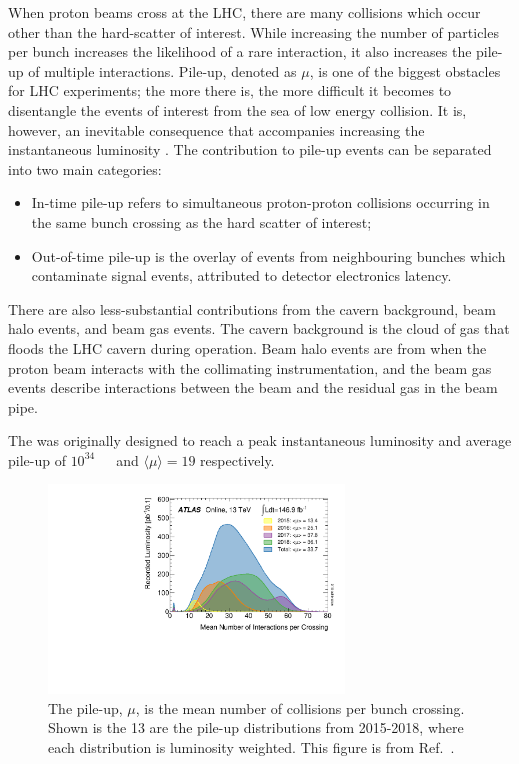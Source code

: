 When proton beams cross at the LHC, there are many collisions which occur other than the hard-scatter of interest. While increasing the number of particles per bunch increases the likelihood of a rare interaction, it also increases the pile-up of multiple interactions. Pile-up, denoted as $\mu$, is one of the biggest obstacles for LHC experiments; the more there is, the more difficult it becomes to disentangle the events of interest from the sea of low energy collision. It is, however, an inevitable consequence that accompanies increasing the instantaneous luminosity . The contribution to pile-up events can be separated into two main categories: 
\begin{itemize}
  \item In-time pile-up refers to simultaneous proton-proton collisions occurring in the same bunch crossing as the hard scatter of interest;
  \item Out-of-time pile-up is the overlay of events from neighbouring bunches which contaminate signal events, attributed to detector electronics latency.
\end{itemize}
There are also less-substantial contributions from the cavern background, beam halo events, and beam gas events. The cavern background is the cloud of gas that floods the LHC cavern during operation. Beam halo events are from when the proton beam interacts with the collimating instrumentation, and the beam gas events describe interactions between the beam and the residual gas in the beam pipe. 

The \LHC was originally designed to reach a peak instantaneous luminosity and average pile-up of \unit{$10^{34}$}{\rpsquare{\cm}\reciprocal{\second}} and $\langle\mu\rangle=19$ respectively. 

\begin{figure}
  \includegraphics[width=0.7\textwidth]{Figures/LHC/PileUp_2015_2018.pdf}
  \caption[Pile-up distributions.]
  {The pile-up, $\mu$, is the mean number of collisions per bunch crossing. Shown is the \unit{13}{\TeV} are the pile-up distributions from 2015-2018, where each distribution is luminosity weighted. This figure is from Ref.~\cite{Boyd:2707815}.}
  \label{fig:Pileup}
\end{figure}

